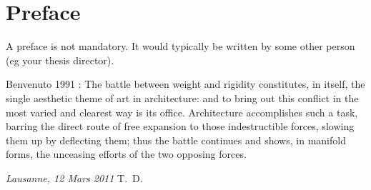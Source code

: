 \chapter*{Preface}
A preface is not mandatory. It would typically be written by some other person (eg your thesis director).

Benvenuto 1991 : The battle between weight and rigidity constitutes, in itself, the single aesthetic theme of art in architecture: and to bring out this conflict in the most varied and clearest way is its office. Architecture accomplishes such a task, barring the direct route of free expansion to those indestructible forces, slowing them up by deflecting them; thus the battle continues and shows, in manifold forms, the unceasing efforts of the two opposing forces.

\bigskip
 
\noindent\textit{Lausanne, 12 Mars 2011}
\hfill T.~D.

